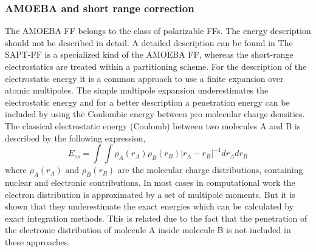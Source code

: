 \documentclass[10pt,a4paper]{article} %
\begin{document}
		\subsubsection{AMOEBA and short range correction}
The AMOEBA FF belongs to the class of polarizable FFs. The energy description should not be described in detail. A detailed description can be found in \cite{Ponder2010}  The SAPT-FF is a specialized kind of the AMOEBA FF, whereas the short-range electrostatics are treated within a partitioning scheme.
For the description of the electrostatic energy it is a common approach
to use a finite expansion over atomic multipoles. The simple multipole
expansion underestimates the electrostatic energy and for a better
description a penetration energy can be included by using the Coulombic
energy between pro molecular charge densities. The classical electrostatic
energy (Coulomb) between two molecules A and B is described by the
following expression,
\begin{equation}
E_{es}=\int\int\rho_{A}(r_{A})\rho_{B}(r_{B})|r_{A}-r_{B}|^{-1}dr_{A}dr_{B}\label{eq:Coulombic}
\end{equation}
where $\rho_{A}(r_{A})$ and $\rho_{B}(r_{B})$ are the molecular
charge distributions, containing nuclear and electronic contributions.
In most cases in computational work the electron distribution is approximated
by a set of multipole moments.\supercite{Stone1996} But it is shown that
they underestimate the exact energies which can be calculated by exact
integration methods. This is related due to the fact that the penetration
of the electronic distribution of molecule A inside molecule B is
not included in these approaches. 
\end{document}
